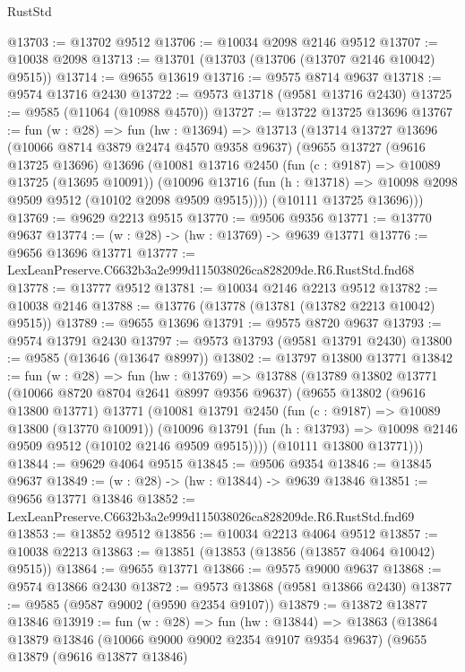 \begin{lexlean}{RustStd}
\begin{coremodule}
@13703 := @13702 @9512
@13706 := @10034 @2098 @2146 @9512
@13707 := @10038 @2098
@13713 := @13701 (@13703 (@13706 (@13707 @2146 @10042) @9515))
@13714 := @9655 @13619
@13716 := @9575 @8714 @9637
@13718 := @9574 @13716 @2430
@13722 := @9573 @13718 (@9581 @13716 @2430)
@13725 := @9585 (@11064 (@10988 @4570))
@13727 := @13722 @13725 @13696
@13767 := fun (w : @28) =>
  fun (hw : @13694) =>
  @13713
    (@13714
      @13727
      @13696
      (@10066 @8714 @3879 @2474 @4570 @9358 @9637)
      (@9655
        @13727
        (@9616 @13725 @13696)
        @13696
        (@10081
          @13716
          @2450
          (fun (c : @9187) => @10089 @13725 (@13695 @10091))
          (@10096 @13716 (fun (h : @13718) => @10098 @2098 @9509 @9512 (@10102 @2098 @9509 @9515))))
        (@10111 @13725 @13696)))
@13769 := @9629 @2213 @9515
@13770 := @9506 @9356
@13771 := @13770 @9637
@13774 := (w : @28) -> (hw : @13769) -> @9639 @13771
@13776 := @9656 @13696 @13771
@13777 := LexLeanPreserve.C6632b3a2e999d115038026ca828209de.R6.RustStd.fnd68
@13778 := @13777 @9512
@13781 := @10034 @2146 @2213 @9512
@13782 := @10038 @2146
@13788 := @13776 (@13778 (@13781 (@13782 @2213 @10042) @9515))
@13789 := @9655 @13696
@13791 := @9575 @8720 @9637
@13793 := @9574 @13791 @2430
@13797 := @9573 @13793 (@9581 @13791 @2430)
@13800 := @9585 (@13646 (@13647 @8997))
@13802 := @13797 @13800 @13771
@13842 := fun (w : @28) =>
  fun (hw : @13769) =>
  @13788
    (@13789
      @13802
      @13771
      (@10066 @8720 @8704 @2641 @8997 @9356 @9637)
      (@9655
        @13802
        (@9616 @13800 @13771)
        @13771
        (@10081
          @13791
          @2450
          (fun (c : @9187) => @10089 @13800 (@13770 @10091))
          (@10096 @13791 (fun (h : @13793) => @10098 @2146 @9509 @9512 (@10102 @2146 @9509 @9515))))
        (@10111 @13800 @13771)))
@13844 := @9629 @4064 @9515
@13845 := @9506 @9354
@13846 := @13845 @9637
@13849 := (w : @28) -> (hw : @13844) -> @9639 @13846
@13851 := @9656 @13771 @13846
@13852 := LexLeanPreserve.C6632b3a2e999d115038026ca828209de.R6.RustStd.fnd69
@13853 := @13852 @9512
@13856 := @10034 @2213 @4064 @9512
@13857 := @10038 @2213
@13863 := @13851 (@13853 (@13856 (@13857 @4064 @10042) @9515))
@13864 := @9655 @13771
@13866 := @9575 @9000 @9637
@13868 := @9574 @13866 @2430
@13872 := @9573 @13868 (@9581 @13866 @2430)
@13877 := @9585 (@9587 @9002 (@9590 @2354 @9107))
@13879 := @13872 @13877 @13846
@13919 := fun (w : @28) =>
  fun (hw : @13844) =>
  @13863
    (@13864
      @13879
      @13846
      (@10066 @9000 @9002 @2354 @9107 @9354 @9637)
      (@9655
        @13879
        (@9616 @13877 @13846)

\end{coremodule}
\end{lexlean}
